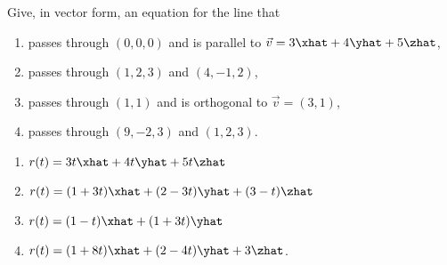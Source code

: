 \begin{exercises}
    \begin{problist}
        \prob   Give, in vector form, an equation for the line that
        \begin{enumerate}
            \item   passes through $(0, 0, 0)$ and is parallel to $\vec{v} = 3\xhat +4\yhat + 5\zhat$,
            \item   passes through $(1, 2, 3)$ and $(4, -1, 2)$,
            \item   passes through $(1, 1)$ and is orthogonal to $\vec{v} = (3, 1)$,
            \item   passes through $(9, -2, 3)$ and $(1, 2, 3)$.
        \end{enumerate}
        \begin{solution}
            \begin{enumerate}
                \item   $r(t) = 3t\xhat + 4t\yhat + 5t\zhat$
                \item   $r(t) = (1+3t)\xhat + (2-3t)\yhat + (3-t)\zhat$
                \item   $r(t) = (1-t)\xhat + (1+3t)\yhat$
                \item   $r(t) = (1+8t)\xhat + (2-4t)\yhat + 3\zhat$.
            \end{enumerate}
        \end{solution}


\end{problist}
\end{exercises}
